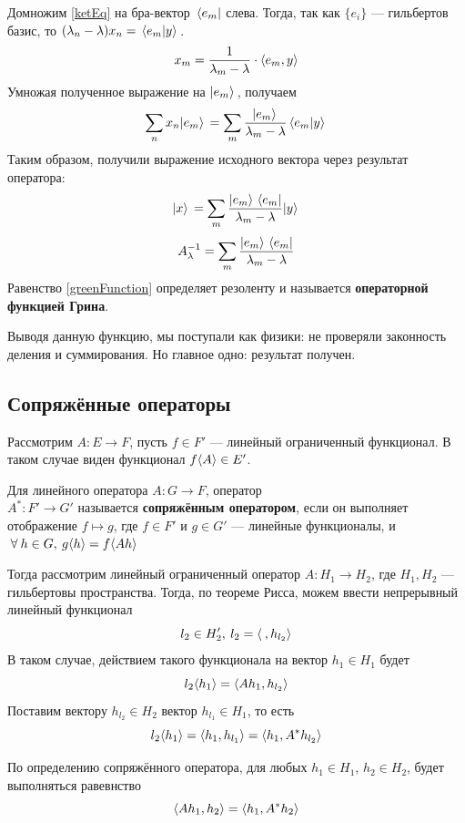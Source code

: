 \documentclass[12pt]{article}
\begin{document}
	Домножим \eqref{ketEq} на бра-вектор $\, \langle e_m |$ слева. Тогда, так как $\{e_i\}$ --- гильбертов базис,
	то $(\lambda_n - \lambda) x_n = \, \langle e_m | y \rangle \,$.
	$$ x_m = \frac{1}{\lambda_m - \lambda} \cdot \left\langle e_m, y \right\rangle $$
	Умножая полученное выражение на $| e_m \rangle \,$, получаем
	$$ \sum_n x_n | e_m \rangle \, = \sum_m \frac{| e_m \rangle \,}{\lambda_m - \lambda} \, \langle e_m | y \rangle \, $$
	Таким образом, получили выражение исходного вектора через результат оператора:
	$$ | x \rangle \, = \sum_m \frac{| e_m \rangle \, \, \langle e_m |}{\lambda_m - \lambda} | y \rangle \, $$
	\begin{equation} \label{greenFunction}
		A^{-1}_{\lambda} = \sum_m \frac{| e_m \rangle \, \, \langle e_m |}{\lambda_m - \lambda}
	\end{equation}
	Равенство \eqref{greenFunction} определяет резоленту и называется \textbf{операторной функцией Грина}.
	
	Выводя данную функцию, мы поступали как физики: не проверяли законность деления и суммирования. Но главное одно:
	результат получен.
	
	\subsection{Сопряжённые операторы}
	Рассмотрим $A: E \rightarrow F$, пусть $f\in F'$ --- линейный ограниченный функционал.
	В таком случае виден функционал $f\langle A \rangle \in E'$.
	
	\begin{defi} \label{def:adjointOp}
		Для линейного оператора $A: G \rightarrow F$, оператор \\$A^{*}: F' \rightarrow G'$ 
		называется \textbf{сопряжённым оператором}, если он выполняет отображение $f \mapsto g$,
		где $f \in F'$ и $g \in G'$ --- линейные функционалы, и $\forall h \in G, \: g\angular{h} = f\angular{Ah}$
	\end{defi}
	
	Тогда рассмотрим линейный ограниченный оператор $A: H_1 \rightarrow H_2 $, 
	где $H_1, H_2$ --- гильбертовы пространства. Тогда, по теореме Рисса, можем ввести
	непрерывный линейный функционал 
	$$l_2 \in H_2', \: l_2 = \left\langle \:, h_{l_2} \right\rangle$$
	В таком случае, действием такого функционала на вектор $h_1 \in H_1$ будет
	$$l_2 \langle h_1 \rangle = \left\langle A h_1, h_{l_2} \right\rangle$$
	Поставим вектору $h_{l_2} \in H_2$ вектор $h_{l_1} \in H_1$, то есть
	$$ l_2 \langle h_1 \rangle = \left\langle h_1, h_{l_1} \right\rangle = \left\langle h_1, A^{*} h_{l_2} \right\rangle$$
	
	По определению сопряжённого оператора, для любых $h_1 \in H_1$, $h_2 \in H_2$, будет выполняться равевнство
	\begin{equation} \label{eq:adjointOp}
		\left\langle A h_1, h_2 \right\rangle = \left\langle h_1, A^{*} h_2 \right\rangle
	\end{equation}
	
\end{document}
